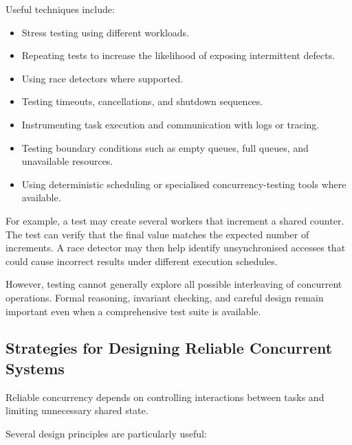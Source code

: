 Useful techniques include:

\begin{itemize}
    \item Stress testing using different workloads.
    \item Repeating tests to increase the likelihood of exposing intermittent defects.
    \item Using race detectors where supported.
    \item Testing timeouts, cancellations, and shutdown sequences.
    \item Instrumenting task execution and communication with logs or tracing.
    \item Testing boundary conditions such as empty queues, full queues, and unavailable resources.
    \item Using deterministic scheduling or specialised concurrency-testing tools where available.
\end{itemize}

For example, a test may create several workers that increment a shared counter. The test can verify that the final value matches the expected number of increments. A race detector may then help identify unsynchronised accesses that could cause incorrect results under different execution schedules.

However, testing cannot generally explore all possible interleaving of concurrent operations. Formal reasoning, invariant checking, and careful design remain important even when a comprehensive test suite is available.

\subsection{Strategies for Designing Reliable Concurrent Systems}

Reliable concurrency depends on controlling interactions between tasks and limiting unnecessary shared state.

Several design principles are particularly useful:

